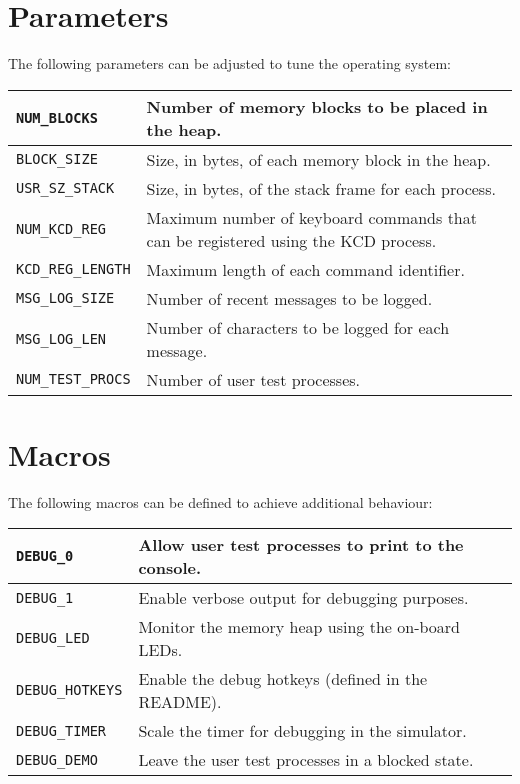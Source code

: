 \documentclass[12pt]{report}
\begin{document}
\section{Parameters}

The following parameters can be adjusted to tune the operating system:\\

\begin{tabularx}{\textwidth}{| l | X |}
    \hline
    \texttt{NUM_BLOCKS} & Number of memory blocks to be placed in the heap.\\
    \hline
    \texttt{BLOCK_SIZE} & Size, in bytes, of each memory block in the heap.\\
    \hline
    \texttt{USR_SZ_STACK} & Size, in bytes, of the stack frame for each process.\\
    \hline
    \texttt{NUM_KCD_REG} & Maximum number of keyboard commands that can be registered using the KCD process.\\
    \hline
    \texttt{KCD_REG_LENGTH} & Maximum length of each command identifier.\\
    \hline
    \texttt{MSG_LOG_SIZE} & Number of recent messages to be logged.\\
    \hline
    \texttt{MSG_LOG_LEN} & Number of characters to be logged for each message.\\
    \hline
    \texttt{NUM_TEST_PROCS} & Number of user test processes.\\
    \hline
\end{tabularx}

\section{Macros}

The following macros can be defined to achieve additional behaviour:\\

\begin{tabularx}{\textwidth}{| l | X |}
    \hline
    \texttt{DEBUG_0} & Allow user test processes to print to the console.\\
    \hline
    \texttt{DEBUG_1} & Enable verbose output for debugging purposes.\\
    \hline
    \texttt{DEBUG_LED} & Monitor the memory heap using the on-board LEDs.\\
    \hline
    \texttt{DEBUG_HOTKEYS} & Enable the debug hotkeys (defined in the README).\\
    \hline
    \texttt{DEBUG_TIMER} & Scale the timer for debugging in the simulator.\\
    \hline
    \texttt{DEBUG_DEMO} & Leave the user test processes in a blocked state.\\
    \hline
\end{tabularx}
\end{document}
